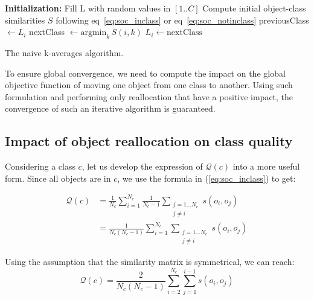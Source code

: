 \documentclass[natbib,smallextended]{svjour3}
\begin{document}
\begin{algorithm}
	\label{algo:naive-kaverages}
	\SetAlgoLined
	\BlankLine
	\textbf{Initialization:}
		Fill L with random values in $[1..C]$\;
		Compute initial object-class similarities $S$ following eq~\ref{eq:soc_inclass} or eq~\ref{eq:soc_notinclass}\;
	\BlankLine
	 {
		 {
			previousClass $\leftarrow L_i$\;
			nextClass $\leftarrow \mathrm{argmin}_k\, S(i, k)$
			 {
				$L_i \leftarrow \mathrm{nextClass}$\;
			}
		}
	}
	\BlankLine
	\caption{The naive k-averages algorithm.}
\end{algorithm}

To ensure global convergence, we need to compute the impact on the global objective function of moving one object from one class to another. Using such formulation and performing only reallocation that have a positive impact, the convergence of such an iterative algorithm is guaranteed.

\subsection{Impact of object reallocation on class quality}

Considering a class $c$, let us develop the expression of $\mathcal{Q}(c)$ into a more useful form. Since all objects are in $c$, we use the formula in (\ref{eq:soc_inclass}) to get:

\begin{equation*}
  \begin{aligned}
    \mathcal{Q}\left(c\right) & = \frac{1}{N_c} \sum_{i=1}^{N_c} \frac{1}{N_c-1} \sum_{\substack{j=1 \ldots N_c\\j \neq i}} s\left(o_i, o_j\right) \\
                              & = \frac{1}{N_c(N_c-1)} \sum_{i=1}^{N_c} \sum_{\substack{j=1 \ldots N_c\\j \neq i}} s\left(o_i, o_j\right)
  \end{aligned}
\end{equation*}

Using the assumption that the similarity matrix is symmetrical, we can reach: %
\begin{equation}
    \mathcal{Q}\left(c\right) = \frac{2}{N_c(N_c-1)} \sum_{i=2}^{N_c} \sum_{j=1}^{i-1} s\left(o_i, o_j\right)
    \label{eq:classQuality}
\end{equation}
\end{document}
